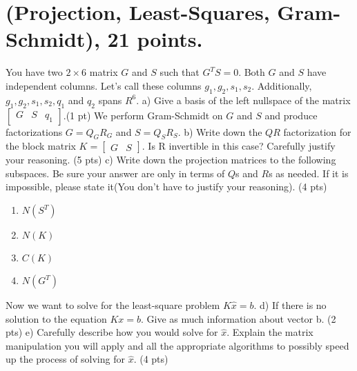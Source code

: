 \documentclass{article}
\begin{document}
\section{(Projection, Least-Squares, Gram-Schmidt), 21 points.}
\newline You have two \(2 \times 6\) matrix \(G\) and \(S\) such that \(G^{T}S = 0\). Both \(G\) and \(S\) have independent columns. Let's call these columns \(g_1, g_2, s_1, s_2\). Additionally, \(g_1, g_2, s_1, s_2, q_1\) and \(q_2\) spans \(R^6\).
\newline
\newline a) Give a basis of the left nullspace of the matrix \( \begin{bmatrix} G & S & q_1 \end{bmatrix} \).(1 pt)
\newline 
\newline We perform Gram-Schmidt on \(G\) and \(S\) and produce factorizations \(G = Q_{G}R_{G}\) and \(S = Q_{S}R_{S}\).
\newline
\newline b) Write down the \(QR\) factorization for the block matrix \(K = \begin{bmatrix} G & S \end{bmatrix} \). Is R invertible in this case? Carefully justify your reasoning. (5 pts)
\newline
\newline c) Write down the projection matrices to the following subspaces. Be sure your answer are only in terms of \(Q\)s and \(R\)s as needed. If it is impossible, please state it(You don't have to justify your reasoning). (4 pts)
\begin{enumerate}
    \item \(N(S^T)\)
    \item \(N(K)\)
    \item \(C(K)\)
    \item \(N(G^T)\)
\end{enumerate}
\newline
\newline Now we want to solve for the least-square problem \( K\hat{x} = b\).
\newline
\newline d) If there is no solution to the equation \( Kx = b \). Give as much information about vector b. (2 pts)
\newline
\newline e) Carefully describe how you would solve for \(\hat{x}\). Explain the matrix manipulation you will apply and all the appropriate algorithms to possibly speed up the process of solving for \(\hat{x}\). (4 pts)
\end{document}
